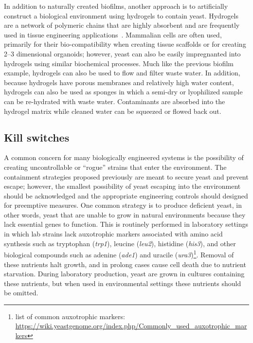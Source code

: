 \documentclass[../main/main]{subfiles}
\begin{document}
In addition to naturally created biofilms, another approach is to artificially construct a biological environment using hydrogels to contain yeast. Hydrogels are a network of polymeric chains that are highly absorbent and are frequently used in tissue engineering applications~\cite{lee2001hydrogels}. Mammalian cells are often used, primarily for their bio-compatibility when creating tissue scaffolds or for creating 2--3 dimensional organoids; however, yeast can also be easily impregnanted into hydrogels using similar biochemical processes. Much like the previous biofilm example, hydrogels can also be used to flow and filter waste water. In addition, because hydrogels have porous membranes and relatively high water content, hydrogels can also be used as sponges in which a semi-dry or lyophilized sample can be re-hydrated with waste water. Contaminants are absorbed into the hydrogel matrix while cleaned water can be squeezed or flowed back out.

\subsection*{Kill switches}
A common concern for many biologically engineered systems is the possibility of creating uncontrollable or ``rogue'' strains that enter the environment. The containment strategies proposed previously are meant to secure yeast and prevent escape; however, the smallest possibility of yeast escaping into the environment should be acknowledged and the appropriate engineering controls should designed for preemptive measures. One common strategy is to produce deficient yeast, in other words, yeast that are unable to grow in natural environments because they lack essential genes to function. This is routinely performed in laboratory settings in which lab strains lack auxotrophic markers associated with amino acid synthesis such as tryptophan (\textit{trp1}), leucine (\textit{leu2}), histidine (\textit{his3}), and other biological compounds such as adenine (\textit{ade1}) and uracile (\textit{ura3})\footnote{
	list of common auxotrophic markers: \url{https://wiki.yeastgenome.org/index.php/Commonly_used_auxotrophic_markers}
}. Removal of these nutrients halt growth, and in prolong cases cause cell death due to nutrient starvation. During laboratory production, yeast are grown in cultures containing these nutrients, but when used in environmental settings these nutrients should be omitted.
\end{document}
